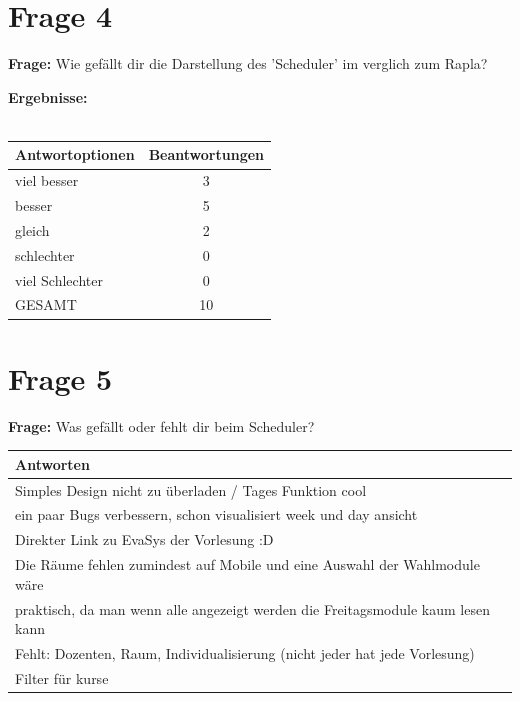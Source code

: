\section{Frage 4}
\textbf{Frage:} Wie gefällt dir die Darstellung des 'Scheduler' im verglich zum Rapla?
\begin{figure}
	\centering
\end{figure}
\textbf{Ergebnisse:}\\
\\
\begin{tabular}{|l|c|}\hline
	\textbf{Antwortoptionen} & \textbf{Beantwortungen} \\\hline
	viel besser  	& 3 \\\hline
	besser			& 5 \\\hline
	gleich 			& 2 \\\hline
	schlechter 		& 0 \\\hline
	viel Schlechter	& 0 \\\hline
	GESAMT			& 10 \\\hline			
\end{tabular}

\section{Frage 5}
\textbf{Frage:} Was gefällt oder fehlt dir beim Scheduler?\\
\begin{tabular}{|l|}\hline
	\textbf{Antworten} \\\hline
	Simples Design nicht zu überladen / Tages Funktion cool  \\\hline
	ein paar Bugs verbessern, schon visualisiert week und day ansicht \\\hline
	Direkter Link zu EvaSys der Vorlesung :D \\\hline
	Die Räume fehlen zumindest auf Mobile und eine Auswahl der Wahlmodule wäre\\
	praktisch, da man wenn alle angezeigt werden die Freitagsmodule kaum lesen kann 
	\\\hline
	Fehlt: Dozenten, Raum, Individualisierung (nicht jeder hat jede Vorlesung) \\\hline
	Filter für kurse \\\hline			
\end{tabular}

